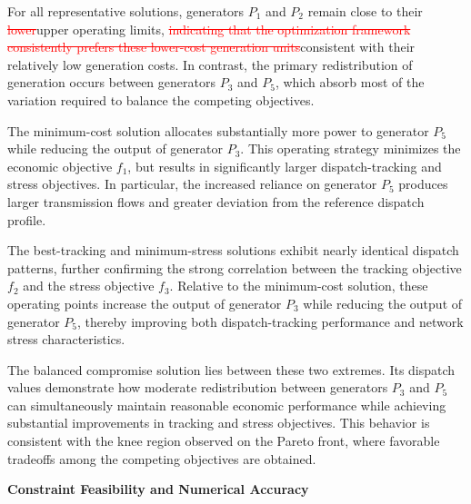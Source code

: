\documentclass[11pt,pdflatex,sn-mathphys-ay]{sn-jnl}%
\theoremstyle{definition}
\theoremstyle{thmstyleone}%
\theoremstyle{thmstyletwo}%
\theoremstyle{thmstylethree}%
\newcommand{\del}[1]{\textcolor{red}{\sout{#1}}}
\newcommand{\add}[1]{\textcolor{revisionblue}{#1}}
\begin{document}
	For all representative solutions, generators \(P_1\) and \(P_2\) remain close to their \del{lower}\add{upper} operating limits, \del{indicating that the optimization framework consistently prefers these lower-cost generation units}\add{consistent
		with their relatively low generation costs}. In contrast, the primary redistribution of generation occurs between generators \(P_3\) and \(P_5\), which absorb most of the variation required to balance the competing objectives.
	
	The minimum-cost solution allocates substantially more power to generator \(P_5\) while reducing the output of generator \(P_3\). This operating strategy minimizes the economic objective \(f_1\), but results in significantly larger dispatch-tracking and stress objectives. In particular, the increased reliance on generator \(P_5\) produces larger transmission flows and greater deviation from the reference dispatch profile.
	
	The best-tracking and minimum-stress solutions exhibit nearly identical dispatch patterns, further confirming the strong correlation between the tracking objective \(f_2\) and the stress objective \(f_3\). Relative to the minimum-cost solution, these operating points increase the output of generator \(P_3\) while reducing the output of generator \(P_5\), thereby improving both dispatch-tracking performance and network stress characteristics.
	
	The balanced compromise solution lies between these two extremes. Its dispatch values demonstrate how moderate redistribution between generators \(P_3\) and \(P_5\) can simultaneously maintain reasonable economic performance while achieving substantial improvements in tracking and stress objectives. This behavior is consistent with the knee region observed on the Pareto front, where favorable tradeoffs among the competing objectives are obtained.
	
	\medskip \noindent \textbf{Constraint Feasibility and Numerical Accuracy}
	
\end{document}
